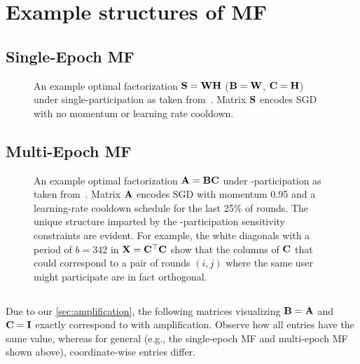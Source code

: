 \documentclass{article}
\begin{document}
\section{Example structures of MF}\label{sec:structure}
\subsection{Single-Epoch MF}
\begin{figure}[H]
    \centering
    \vspace{-2em}
    \caption{An example optimal factorization $\mathbf{S} = \mathbf{W} \mathbf{H}$ ($\mathbf{B} = \mathbf{W}$, $\mathbf{C} = \mathbf{H}$) under single-participation as taken from~\citet{denisov22matfact}. Matrix $\mathbf{S}$ encodes SGD with no momentum or learning rate cooldown.}
    \label{fig:me-visualization}
    \vspace{-1em}
\end{figure}
\subsection{Multi-Epoch MF}
\begin{figure}[H]
    \centering
    \vspace{-2em}
    \caption{An example optimal factorization $\mathbf{A} = \mathbf{B} \mathbf{C}$ under -participation as taken from~\citet{choquette2022multi}. Matrix $\mathbf{A}$ encodes SGD with momentum 0.95 and a learning-rate cooldown schedule for the last 25\% of rounds. The unique structure imparted by the \multiepoch-participation sensitivity constraints are evident. For example, the white diagonals with a period of $b=342$ in $\mathbf{X} = \mathbf{C}^\top \mathbf{C}$ show that the columns of $\mathbf{C}$ that could correspond to a pair of rounds $(i, j)$ where the same user might participate are in fact orthogonal.}
    \label{fig:me-visualization}
    \vspace{-1em}
\end{figure}

\subsection{\dpsgd}
Due to our \cref{sec:amplification}, the following matrices visualizing $\mathbf{B}=\mathbf{A}$ and $\mathbf{C}=\mathbf{I}$ exactly correspond to \dpsgd with amplification. Observe how all entries have the same value, whereas for general \mfftrl (e.g., the single-epoch MF and multi-epoch MF shown above), coordinate-wise entries differ.
\end{document}
